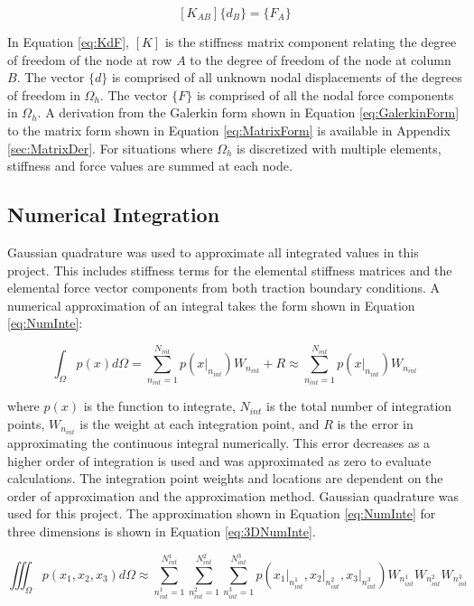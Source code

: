 \documentclass[a4paper, 12pt]{article}
\begin{document}
\begin{equation} \label{eq:KdF}
[ K_{AB} ] \{ d_B \} = \{ F_A \} 
\end{equation}

\noindent
In Equation \ref{eq:KdF}, $[K]$ is the stiffness matrix component 
relating the degree of freedom of the node at row $A$ to the degree of freedom 
of the node at column $B$. The vector $\{d\}$ is comprised of all unknown 
nodal displacements of the degrees of freedom in $\Omega_h$. The 
vector $\{F\}$ is comprised of all the nodal force components in $\Omega_h$.
A derivation from the Galerkin form shown in Equation \ref{eq:GalerkinForm}
to the matrix form shown in Equation \ref{eq:MatrixForm} is available in Appendix
\ref{sec:MatrixDer}. For situations where $\Omega_h$ is discretized with 
multiple elements, stiffness and force values are summed at each node.

\subsection{Numerical Integration} \label{subsec:numInt}
Gaussian quadrature was used to approximate all integrated 
values in this project. This includes stiffness terms
for the elemental stiffness matrices and the elemental force vector components
from both traction boundary conditions. 
A numerical approximation of an integral takes the form shown in 
Equation \ref{eq:NumInte}:

\begin{equation} \label{eq:NumInte}
\int_{\Omega} p(x) d\Omega 
  = \sum_{n_{int}=1}^{N_{int}} p(x\Big|_{n_{int}}) W_{n_{int}} + R 
  \approx \sum_{n_{int}=1}^{N_{int}} p(x\Big|_{n_{int}}) W_{n_{int}}
\end{equation}

\noindent
where $p(x)$ is the function to integrate, $N_{int}$ is the total number 
of integration points, $W_{n_{int}}$ is the weight at each integration point, 
and $R$ is the error in approximating the continuous integral numerically.
This error decreases as a higher order of integration is used and was
approximated as zero to evaluate calculations.
The integration point weights and locations are dependent on the order of
approximation and the approximation method. Gaussian quadrature was
used for this project. The approximation shown in Equation \ref{eq:NumInte}
for three dimensions is shown in Equation \ref{eq:3DNumInte}.

\begin{equation} \label{eq:3DNumInte}
\iiint_{\Omega} p(x_1, x_2, x_3) d\Omega \approx 
  \sum_{n^1_{int}=1}^{N^1_{int}} 
  \sum_{n^2_{int}=1}^{N^2_{int}} 
  \sum_{n^3_{int}=1}^{N^3_{int}} 
  p(x_1\Big|_{n^1_{int}}, 
  x_2\Big|_{n^2_{int}}, 
  x_3\Big|_{n^3_{int}})
  W_{n^1_{int}}
  W_{n^2_{int}}
  W_{n^3_{int}}
\end{equation}
\end{document}
